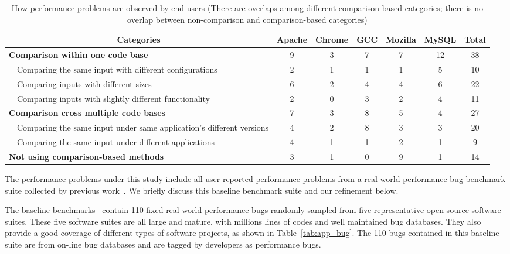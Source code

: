 \begin{table*}[tb!]
\begin{adjustwidth}{-1.5in}{-1.5in}
\scriptsize
\centering
{
\begin{tabular}{lcccccc}
\toprule
\multicolumn{1}{c}{Categories} &Apache&Chrome&GCC&Mozilla&MySQL&Total\\
\midrule
\multicolumn{1}{l}{\textbf{Comparison within one code base}}
&9&3&7&7&12&38\\
\ \ Comparing the same input with different configurations &2&1&1&1&5&10\\
\ \ Comparing inputs with different sizes&6&2&4&4&6&22\\
\ \ Comparing inputs with slightly different functionality&2&0&3&2&4&11\\
\midrule
\multicolumn{1}{l}{\textbf{Comparison cross multiple code bases}}
&7&3&8&5&4&27\\
\ \ Comparing the same input under same application's different versions
&4&2&8&3&3&20\\
\ \ Comparing the same input under different applications
&4&1&1&2&1&9\\
\midrule
\multicolumn{1}{l}{\textbf{Not using comparison-based methods}}
&3&1&0&9&1&14\\
\bottomrule
\end{tabular}
}
\end{adjustwidth}
\caption{How performance problems are observed by end users (There are overlaps among
    different comparison-based categories; there is no overlap between non-comparison
    and comparison-based categories)}
\label{tab:cmp}
\end{table*}

The performance problems under this study include all user-reported
performance problems from a real-world performance-bug benchmark suite 
collected by 
previous work~\citep{PerfBug}. We briefly discuss this baseline benchmark
suite and our refinement below.

The baseline benchmarks~\citep{PerfBug} contain 110 fixed real-world performance
bugs randomly sampled from five representative open-source software suites.
These five software suites are all large and mature,
with millions lines of codes and well maintained bug databases. 
They also provide a good coverage of different types of software projects, as
shown in Table~\ref{tab:app_bug}.
The 110 bugs contained in this baseline suite are from
on-line bug databases and are tagged by developers as performance
bugs.

